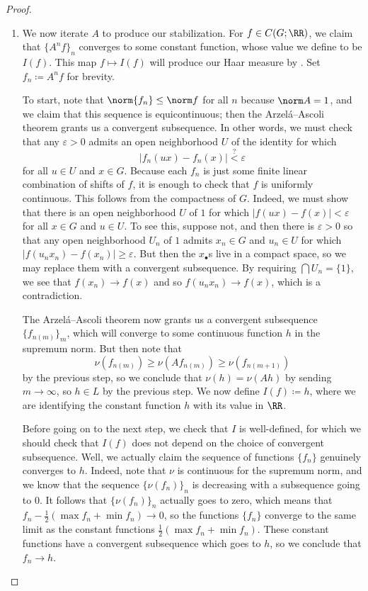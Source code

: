 \documentclass[../notes.tex]{subfiles}
\begin{document}
\begin{proof}
\begin{enumerate}[resume]
		\item We now iterate $A$ to produce our stabilization. For $f\in C(G;\RR)$, we claim that $\{A^nf\}_n$ converges to some constant function, whose value we define to be $I(f)$. This map $f\mapsto I(f)$ will produce our Haar measure by . Set $f_n\coloneqq A^nf$ for brevity.

		To start, note that $\norm{f_n}\le\norm f$ for all $n$ because $\norm A=1$, and we claim that this sequence is equicontinuous; then the Arzel\'a--Ascoli theorem grants us a convergent subsequence. In other words, we must check that any $\varepsilon>0$ admits an open neighborhood $U$ of the identity for which
		\[\left|f_n(ux)-f_n(x)\right|\stackrel?<\varepsilon\]
		for all $u\in U$ and $x\in G$. Because each $f_n$ is just some finite linear combination of shifts of $f$, it is enough to check that $f$ is uniformly continuous. This follows from the compactness of $G$. Indeed, we must show that there is an open neighborhood $U$ of $1$ for which $\left|f(ux)-f(x)\right|<\varepsilon$ for all $x\in G$ and $u\in U$. To see this, suppose not, and then there is $\varepsilon>0$ so that any open neighborhood $U_n$ of $1$ admits $x_n\in G$ and $u_n\in U$ for which $\left|f(u_nx_n)-f(x_n)\right|\ge\varepsilon$. But then the $x_\bullet$s live in a compact space, so we may replace them with a convergent subsequence. By requiring $\bigcap U_n=\{1\}$, we see that $f(x_n)\to f(x)$ and so $f(u_nx_n)\to f(x)$, which is a contradiction.

		The Arzel\'a--Ascoli theorem now grants us a convergent subsequence $\{f_{n(m)}\}_m$, which will converge to some continuous function $h$ in the supremum norm. But then note that
		\[\nu(f_{n(m)})\ge\nu(Af_{n(m)})\ge\nu(f_{n(m+1)})\]
		by the previous step, so we conclude that $\nu(h)=\nu(Ah)$ by sending $m\to\infty$, so $h\in L$ by the previous step. We now define $I(f)\coloneqq h$, where we are identifying the constant function $h$ with its value in $\RR$.
		
		Before going on to the next step, we check that $I$ is well-defined, for which we should check that $I(f)$ does not depend on the choice of convergent subsequence. Well, we actually claim the sequence of functions $\{f_n\}$ genuinely converges to $h$. Indeed, note that $\nu$ is continuous for the supremum norm, and we know that the sequence $\{\nu(f_n)\}_n$ is decreasing with a subsequence going to $0$. It follows that $\{\nu(f_n)\}_n$ actually goes to zero, which means that $f_n-\frac12(\max f_n+\min f_n)\to0$, so the functions $\{f_n\}$ converge to the same limit as the constant functions $\frac12(\max f_n+\min f_n)$. These constant functions have a convergent subsequence which goes to $h$, so we conclude that $f_n\to h$.


\end{enumerate}
\end{proof}
\end{document}
